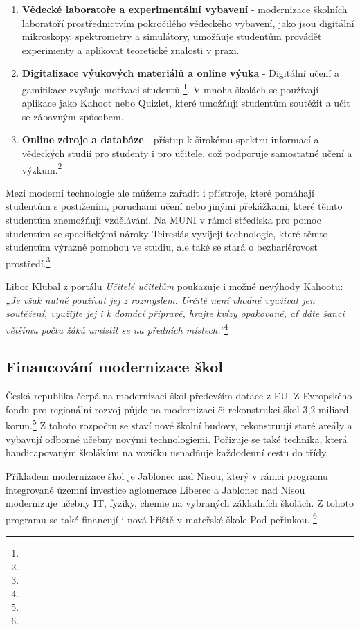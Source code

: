 \documentclass[a4paper,12pt,twoside,FP]{article}
\begin{document}
\begin{enumerate}
	\item \textbf{Vědecké laboratoře a experimentální vybavení} - modernizace školních laboratoří prostřednictvím pokročilého vědeckého vybavení, jako jsou digitální mikroskopy, spektrometry a simulátory, umožňuje studentům provádět experimenty a aplikovat teoretické znalosti v praxi.
	\item \textbf{Digitalizace výukových materiálů a online výuka} - Digitální učení a gamifikace zvyšuje motivaci studentů \footnote{}. V mnoha školách se používají aplikace jako Kahoot nebo Quizlet, které umožňují studentům soutěžit a učit se zábavným způsobem.
	\item \textbf{Online zdroje a databáze} - přístup k širokému spektru informací a vědeckých studií pro studenty i pro učitele, což podporuje samostatné učení a výzkum.\footnote{}
\end{enumerate}

Mezi moderní technologie ale můžeme zařadit i přístroje, které pomáhají studentům s postižením, poruchami učení nebo jinými překážkami, které těmto studentům znemožňují vzdělávání. Na MUNI v rámci střediska pro pomoc studentům se specifickými nároky Teiresiás vyvíjejí technologie, které těmto studentům výrazně pomohou ve studiu, ale také se stará o bezbariérovost prostředí.\footnote{}

Libor Klubal z portálu \textit{Učitelé učitelům} poukazuje i možné nevýhody Kahootu: \textit{„Je však nutné používat jej z rozmyslem. Určitě není vhodné využívat jen soutěžení, využijte jej i k domácí přípravě, hrajte kvízy opakovaně, ať dáte šanci většímu počtu žáků umístit se na předních místech.”}\footnote{}

\subsection{Financování modernizace škol}
Česká republika čerpá na modernizaci škol především dotace z EU. Z Evropského fondu pro regionální rozvoj půjde na modernizaci či rekonstrukci škol 3,2 miliard korun.\footnote{} Z tohoto rozpočtu se staví nové školní budovy, rekonstruují staré areály a vybavují odborné učebny novými technologiemi. Pořizuje se také technika, která handicapovaným školákům na vozíčku usnadňuje každodenní cestu do třídy.

Příkladem modernizace škol je Jablonec nad Nisou, který v rámci programu integrované územní investice aglomerace Liberec a Jablonec nad Nisou modernizuje učebny IT, fyziky, chemie na vybraných základních školách. Z tohoto programu se také financují i nová hřiště v mateřské škole Pod peřinkou. \footnote{}
\end{document}

